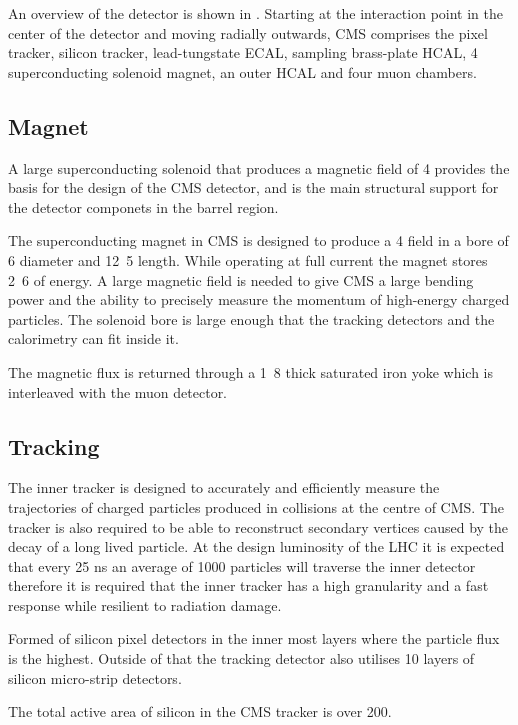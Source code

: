 An overview of the detector is shown in .
Starting at the interaction point in the center of the detector and moving
radially outwards, CMS comprises the pixel tracker, silicon tracker, lead-tungstate
ECAL, sampling brass-plate HCAL, \unit{4}{\tesla} superconducting
solenoid magnet, an outer HCAL and four muon chambers.

\subsection{Magnet}
A large superconducting solenoid that produces a magnetic field of
\unit{4}{\tesla} provides the basis for the design of the CMS detector, and is
the main structural support for the detector componets in the barrel region.

The superconducting magnet in CMS is designed to produce a \unit{4}{\tesla}
field in a bore of 
\unit{6}{\meter} diameter and \unit{12.5}{\meter} length.
While operating at full current the magnet stores \unit{2.6}{\giga\joule} of 
energy.
A large magnetic field is needed to give CMS a large bending power and the
ability to precisely measure the momentum of high-energy charged particles.
The solenoid bore is large enough that the tracking detectors and the
calorimetry can fit inside it.\cite{cms}

The magnetic flux is returned through a \unit{1.8}{\meter} thick saturated iron
yoke which is interleaved with the muon detector.

\subsection{Tracking}
The inner tracker is designed to accurately and efficiently measure the
trajectories of charged particles produced in collisions at the centre of CMS.
The tracker is also required to be able to reconstruct secondary vertices
caused by the decay of a long lived particle.
At the design luminosity of the LHC it is expected that every 25 ns an average
of 1000 particles will traverse the 
inner detector therefore it is required that the inner tracker has a high
granularity and a fast response while 
resilient to radiation damage. 

Formed of silicon pixel detectors in the inner most layers where the particle
flux is the highest.
Outside of that the tracking detector also utilises 10 layers of silicon
micro-strip detectors.

The total active area of silicon in the CMS tracker is over
\unit{200}{\meter\squared}.\cite{cms}

